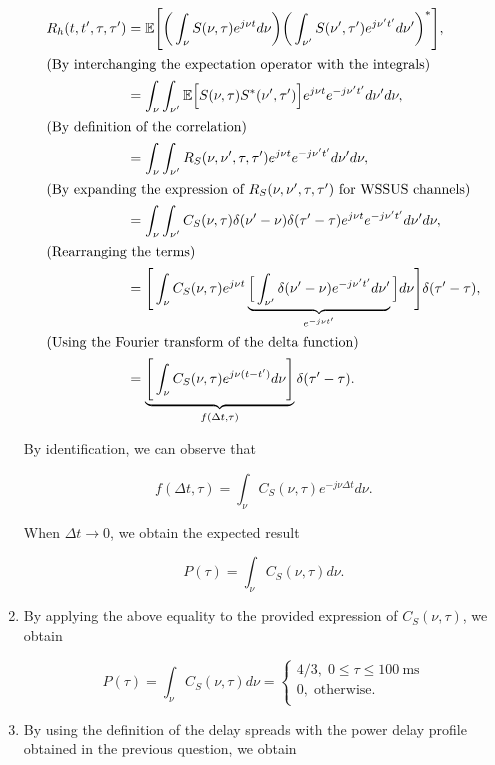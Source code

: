 \documentclass [a4paper, 11pt] {article}
\begin{document}
\begin{solution}
\begin{enumerate}
            \begin{align}
                R_h(t,t',\tau,\tau') &= \mathbb{E}\Bigg[ \bigg(\int_{\nu} S(\nu,\tau)e^{j\nu t}d\nu \bigg)  \bigg( \int_{\nu'} S(\nu',\tau')e^{j\nu' t'}d\nu'\bigg)^*  \Bigg], \\ \intertext{(By interchanging the expectation operator with the integrals)}
                &= \int_{\nu}\int_{\nu'} \mathbb{E}\Big[S(\nu,\tau)S^*(\nu',\tau') \Big]e^{j\nu t}e^{-j\nu' t'}d\nu'd\nu, \\ \intertext{(By definition of the correlation)}
                &= \int_{\nu}\int_{\nu'} R_S(\nu, \nu', \tau, \tau') e^{j\nu t}e^{-j\nu' t'}d\nu'd\nu, \\ \intertext{(By expanding the expression of $ R_S(\nu, \nu', \tau, \tau')$ for WSSUS channels)}
                &= \int_{\nu}\int_{\nu'} C_S(\nu,\tau) \delta(\nu' - \nu) \delta(\tau' - \tau) e^{j\nu t}e^{-j\nu' t'}d\nu'd\nu,\\ \intertext{(Rearranging the terms)}
                &= \Bigg[ \int_{\nu} C_S(\nu,\tau) e^{j\nu t} \underbrace{\Big[\int_{\nu'} \delta(\nu' - \nu)  e^{-j\nu' t'} d\nu'}_{e^{-j\nu t'}} \Big] d\nu \Bigg]\delta(\tau' - \tau),\\\intertext{(Using the Fourier transform of the delta function)}
                &= \underbrace{\Bigg[\int_{\nu} C_S(\nu,\tau) e^{j\nu (t-t')}d\nu \Bigg]}_{f(\Delta t,\tau)} \delta(\tau' - \tau).
            \end{align}

            By identification, we can observe that

            \begin{equation}f(\Delta t,\tau) = \int_{\nu} C_S(\nu,\tau) e^{-j\nu \Delta t }d\nu.
            \end{equation}

            When $\Delta t \rightarrow 0$, we obtain the expected result

            \begin{equation}P(\tau) = \int_{\nu} C_S(\nu, \tau) d\nu.
            \end{equation}

            \item By applying the above equality to the provided expression of $C_S(\nu, \tau)$, we obtain

            \begin{equation}
                P(\tau) = \int_{\nu} C_S(\nu, \tau) d\nu = \left\{
                        \begin{array}{ll}
                          4/3, \; 0 \leq \tau \leq \SI{100}{\milli\second}\\
                          0, \; \text{otherwise}. \\
                        \end{array}
                      \right.
            \end{equation}
            \item By using the definition of the delay spreads with the power delay profile obtained in the previous question, we obtain


\end{enumerate}
\end{solution}
\end{document}
